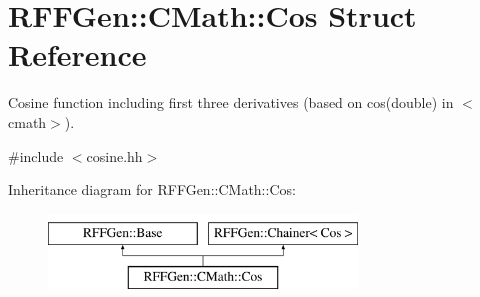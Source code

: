 \hypertarget{structRFFGen_1_1CMath_1_1Cos}{\section{R\-F\-F\-Gen\-:\-:C\-Math\-:\-:Cos Struct Reference}
\label{structRFFGen_1_1CMath_1_1Cos}
}


Cosine function including first three derivatives (based on cos(double) in $<$cmath$>$).  




{\ttfamily \#include $<$cosine.\-hh$>$}

Inheritance diagram for R\-F\-F\-Gen\-:\-:C\-Math\-:\-:Cos\-:\begin{figure}[H]
\begin{center}
\leavevmode
\includegraphics[height=2.000000cm]{structRFFGen_1_1CMath_1_1Cos}
\end{center}
\end{figure}
